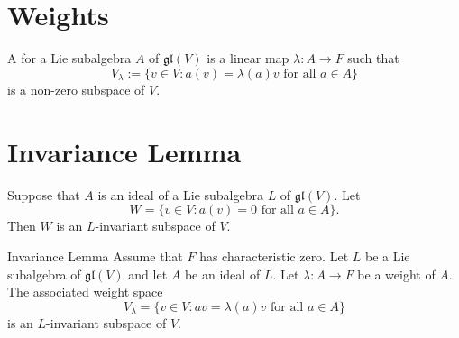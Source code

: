 \documentclass[../main.tex]{subfiles}
\begin{document}
\section{Weights}
\begin{definition}{}{}
A  for a Lie subalgebra $A$ of $\mathfrak{gl}(V)$ is a linear map $\lambda : A \to F$ such that
\[
V_\lambda := \{v \in V : a(v) = \lambda(a)v \text{ for all } a \in A\}
\]
is a non-zero subspace of $V$.
\end{definition}


\section{Invariance Lemma}
\begin{lemma}{}{}
Suppose that $A$ is an ideal of a Lie subalgebra $L$ of $\mathfrak{gl}(V)$. Let
\[
W = \{v \in V : a(v) = 0 \text{ for all } a \in A\}.
\]
Then $W$ is an $L$-invariant subspace of $V$.
\end{lemma}
\begin{lemma}{Invariance Lemma}{}
Assume that $F$ has characteristic zero. Let $L$ be a Lie subalgebra of $\mathfrak{gl}(V)$ and let $A$ be an ideal of $L$. Let $\lambda: A \to F$ be a weight of $A$. The associated weight space
\[
V_\lambda = \{v \in V : av = \lambda(a)v \text{ for all } a \in A\}
\]
is an $L$-invariant subspace of $V$.
\end{lemma}
\end{document}
